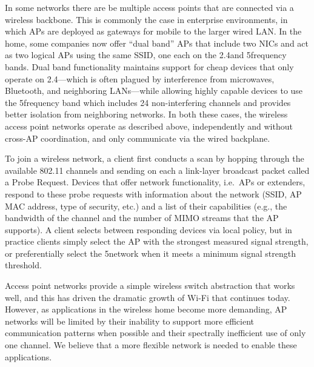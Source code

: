 \label{sec:wds}
In some networks there are be multiple access points that are connected via a wireless backbone. This is commonly the case in enterprise environments, in which APs are deployed as gateways for mobile to the larger wired LAN\@. In the home, some companies now offer ``dual band'' APs that include two NICs and act as two logical APs using the same SSID, one each on the 2.4\GHz and 5\GHz frequency bands. Dual band functionality maintains support for cheap devices that only operate on 2.4\GHz---which is often plagued by interference from microwaves, Bluetooth, and neighboring LANs---while allowing highly capable devices to use the 5\GHz frequency band which includes 24 non-interfering channels and provides better isolation from neighboring networks. In both these cases, the wireless access point networks operate as described above, independently and without cross-AP coordination, and only communicate via the wired backplane.

To join a wireless network, a client first conducts a scan by hopping through the available 802.11 channels and sending on each a link-layer broadcast packet called a Probe Request. Devices that offer network functionality, i.e.\ APs or extenders, respond to these probe requests with information about the network (SSID, AP MAC address, type of security, etc.) and a list of their capabilities (e.g., the bandwidth of the channel and the number of MIMO streams that the AP supports). A client selects between responding devices via local policy, but in practice clients simply select the AP with the strongest measured signal strength, or preferentially select the 5\GHz network when it meets a minimum signal strength threshold.

 Access point networks provide a simple wireless switch abstraction that works well, and this has driven the dramatic growth of Wi-Fi that continues today. However, as applications in the wireless home become more demanding, AP networks will be limited by their inability to support more efficient communication patterns when possible and their spectrally inefficient use of only one channel. We believe that a more flexible network is needed to enable these applications.

